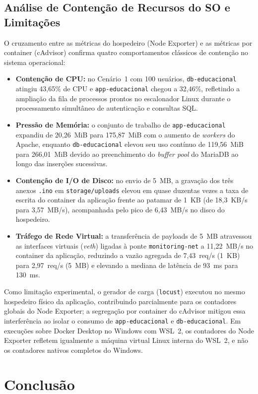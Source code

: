 \documentclass[conference]{IEEEtran}
\begin{document}
\subsection{Análise de Contenção de Recursos do SO e Limitações}
O cruzamento entre as métricas do hospedeiro (Node Exporter) e as métricas por container (cAdvisor) confirma quatro comportamentos clássicos de contenção no sistema operacional:
\begin{itemize}
    \item \textbf{Contenção de CPU:} no Cenário~1 com 100 usuários, \texttt{db-educacional} atingiu 43,65\% de CPU e \texttt{app-educacional} chegou a 32,46\%, refletindo a ampliação da fila de processos prontos no escalonador Linux durante o processamento simultâneo de autenticação e consultas SQL.
    \item \textbf{Pressão de Memória:} o conjunto de trabalho de \texttt{app-educacional} expandiu de 20,26~MiB para 175,87~MiB com o aumento de \textit{workers} do Apache, enquanto \texttt{db-educacional} elevou seu uso contínuo de 119,56~MiB para 266,01~MiB devido ao preenchimento do \textit{buffer pool} do MariaDB ao longo das inserções sucessivas.
    \item \textbf{Contenção de I/O de Disco:} no envio de 5~MB, a gravação dos três anexos \texttt{.ino} em \texttt{storage/uploads} elevou em quase duzentas vezes a taxa de escrita do container da aplicação frente ao patamar de 1~KB (de 18,3~KB/s para 3,57~MB/s), acompanhada pelo pico de 6,43~MB/s no disco do hospedeiro.
    \item \textbf{Tráfego de Rede Virtual:} a transferência de payloads de 5~MB atravessou as interfaces virtuais (\textit{veth}) ligadas à ponte \texttt{monitoring-net} a 11,22~MB/s no container da aplicação, reduzindo a vazão agregada de 7,43~req/s (1~KB) para 2,97~req/s (5~MB) e elevando a mediana de latência de 93~ms para 130~ms.
\end{itemize}

Como limitação experimental, o gerador de carga (\texttt{locust}) executou no mesmo hospedeiro físico da aplicação, contribuindo parcialmente para os contadores globais do Node Exporter; a segregação por container do cAdvisor mitigou essa interferência ao isolar o consumo de \texttt{app-educacional} e \texttt{db-educacional}. Em execuções sobre Docker Desktop no Windows com WSL~2, os contadores do Node Exporter refletem igualmente a máquina virtual Linux interna do WSL~2, e não os contadores nativos completos do Windows.

\section{Conclusão}
\end{document}
